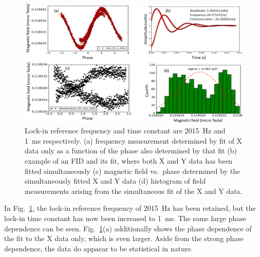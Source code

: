 \begin{figure}%
\centering\includegraphics[width=\linewidth]{figures/freq_2015_simultaneous_fit_1ms.png}
\caption{Lock-in reference frequency and time constant are 2015~Hz and
  1~ms respectively.  (a) frequency measurement determined by fit of X
  data only as a function of the phase also determined by that fit (b)
  example of an FID and its fit, where both X and Y data has been
  fitted simultaneously (c) magnetic field vs.~phase determined by the
  simultaneously fitted X and Y data (d) histogram of field
  measurements arising from the simultaneous fit of the X and Y
  data.\label{fig:freq_2015_1ms}}
\end{figure}

In Fig.~\ref{fig:freq_2015_1ms}, the lock-in reference frequency of
2015~Hz has been retained, but the lock-in time constant has now been
increased to 1~ms.  The same large phase dependence can be seen.
Fig.~\ref{fig:freq_2015_1ms}(a) additionally shows the phase
dependence of the fit to the X data only, which is even larger.  Aside
from the strong phase dependence, the data do appaear to be
statistical in nature.

